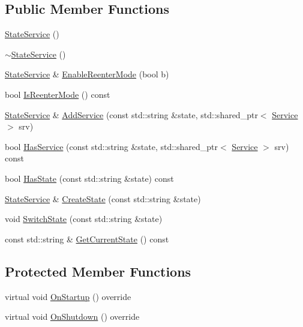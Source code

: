 \subsection*{Public Member Functions}
\begin{DoxyCompactItemize}
\item 
\hyperlink{classastu_1_1StateService_ae8be300ce5fd92351d52fc7162ce9793}{State\+Service} ()
\item 
\hyperlink{classastu_1_1StateService_a27bbe3ef0f9a4600c559ca9f6def3f5f}{$\sim$\+State\+Service} ()
\item 
\hyperlink{classastu_1_1StateService}{State\+Service} \& \hyperlink{classastu_1_1StateService_aab296d0077f23deef7e0bd383516019a}{Enable\+Reenter\+Mode} (bool b)
\item 
bool \hyperlink{classastu_1_1StateService_ac52be3ad8918ef9fe5e64ffbdbdcda94}{Is\+Reenter\+Mode} () const
\item 
\hyperlink{classastu_1_1StateService}{State\+Service} \& \hyperlink{classastu_1_1StateService_aed603f7dca136364b7a6ff815ccb44e0}{Add\+Service} (const std\+::string \&state, std\+::shared\+\_\+ptr$<$ \hyperlink{classastu_1_1Service}{Service} $>$ srv)
\item 
bool \hyperlink{classastu_1_1StateService_ad32ec7a0c3afe7e902aa85de8b4fed15}{Has\+Service} (const std\+::string \&state, std\+::shared\+\_\+ptr$<$ \hyperlink{classastu_1_1Service}{Service} $>$ srv) const
\item 
bool \hyperlink{classastu_1_1StateService_adfd94f9b5d622131a1fdcc4dcf5ef51d}{Has\+State} (const std\+::string \&state) const
\item 
\hyperlink{classastu_1_1StateService}{State\+Service} \& \hyperlink{classastu_1_1StateService_a62ddc47e0c0ed7232e672c995a978a71}{Create\+State} (const std\+::string \&state)
\item 
void \hyperlink{classastu_1_1StateService_a3396bad71a626dd749295375759015d3}{Switch\+State} (const std\+::string \&state)
\item 
const std\+::string \& \hyperlink{classastu_1_1StateService_ac643aebb1bfe9880db1bac7533e0ec75}{Get\+Current\+State} () const
\end{DoxyCompactItemize}
\subsection*{Protected Member Functions}
\begin{DoxyCompactItemize}
\item 
virtual void \hyperlink{classastu_1_1StateService_a06419feca958b72db99dde6eda301f86}{On\+Startup} () override
\item 
virtual void \hyperlink{classastu_1_1StateService_ad8fa5b6d52bd795ebba450f119540d87}{On\+Shutdown} () override
\end{DoxyCompactItemize}
